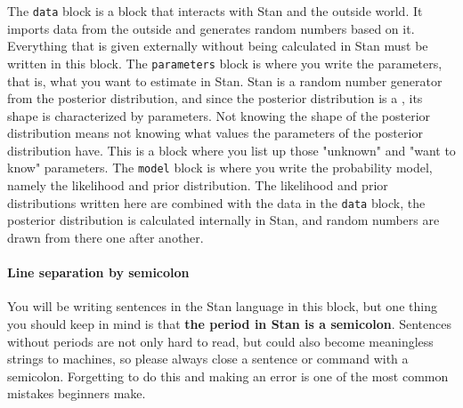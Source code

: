 \documentclass{ltjsbook}
\begin{document}
The \texttt {data} block is a block that interacts with Stan and the outside world. It imports data from the outside and generates random numbers based on it. Everything that is given externally without being calculated in Stan must be written in this block.
The \texttt{parameters} block is where you write the parameters, that is, what you want to estimate in Stan. Stan is a random number generator from the posterior distribution, and since the posterior distribution is a , its shape is characterized by parameters. Not knowing the shape of the posterior distribution means not knowing what values the parameters of the posterior distribution have. This is a block where you list up those "unknown" and "want to know" parameters.
The \texttt{model} block is where you write the probability model, namely the likelihood and prior distribution. The likelihood and prior distributions written here are combined with the data in the \texttt{data} block, the posterior distribution is calculated internally in Stan, and random numbers are drawn from there one after another.

\paragraph{Line separation by semicolon}
You will be writing sentences in the Stan language in this block, but one thing you should keep in mind is that \textbf{the period in Stan is a semicolon}. Sentences without periods are not only hard to read, but could also become meaningless strings to machines, so please always close a sentence or command with a semicolon. Forgetting to do this and making an error is one of the most common mistakes beginners make.
\end{document}
